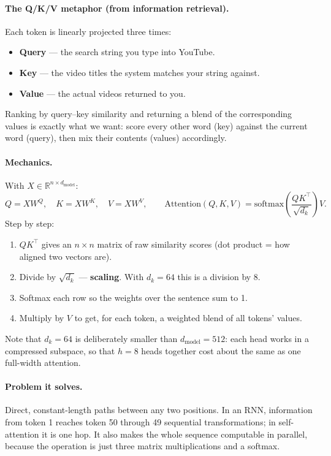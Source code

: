\documentclass[11pt,a4paper]{article}
\begin{document}
\paragraph{The Q/K/V metaphor (from information retrieval).} Each token is linearly
projected three times:
\begin{itemize}
\item \textbf{Query} --- the search string you type into YouTube.
\item \textbf{Key} --- the video titles the system matches your string against.
\item \textbf{Value} --- the actual videos returned to you.
\end{itemize}
Ranking by query--key similarity and returning a blend of the corresponding values is
exactly what we want: score every other word (key) against the current word (query), then
mix their contents (values) accordingly.

\paragraph{Mechanics.} With $X \in \mathbb{R}^{n \times d_{\text{model}}}$:
\[
Q = XW^Q,\quad K = XW^K,\quad V = XW^V, \qquad
\mathrm{Attention}(Q,K,V) = \mathrm{softmax}\!\left(\frac{QK^\top}{\sqrt{d_k}}\right)V .
\]
Step by step:
\begin{enumerate}
\item $QK^\top$ gives an $n \times n$ matrix of raw similarity scores (dot product = how
  aligned two vectors are).
\item Divide by $\sqrt{d_k}$ --- \textbf{scaling}. With $d_k = 64$ this is a division by 8.
\item Softmax each row so the weights over the sentence sum to 1.
\item Multiply by $V$ to get, for each token, a weighted blend of all tokens' values.
\end{enumerate}
Note that $d_k = 64$ is deliberately smaller than $d_{\text{model}} = 512$: each head works
in a compressed subspace, so that $h=8$ heads together cost about the same as one full-width
attention.

\paragraph{Problem it solves.} Direct, constant-length paths between any two positions. In
an RNN, information from token 1 reaches token 50 through 49 sequential transformations; in
self-attention it is one hop. It also makes the whole sequence computable in parallel,
because the operation is just three matrix multiplications and a softmax.
\end{document}
